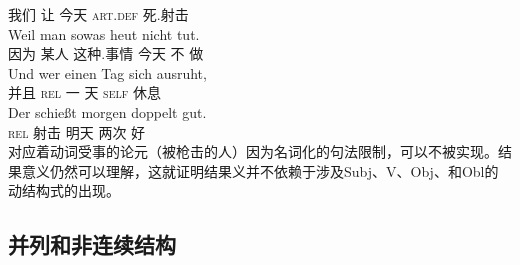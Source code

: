 \begin{exe}
\begin{xlist}[iv.]
\begin{exe}
\begin{xlist}[iv.]
我们  让    今天 \textsc{art}.\textsc{def} 死.射击\\
\gll  Weil  man sowas heut nicht tut.\\
      因为 某人 这种.事情 今天 不 做\\
\gll Und wer einen Tag sich ausruht,\\
     并且 \textsc{rel} 一 天 \textsc{self} 休息\\
\gll Der schießt morgen doppelt gut.\footnotemark\\
\textsc{rel} 射击 明天 两次 好\\
\zl
对应着动词受事的论元（被枪击的人）因为名词化的句法限制，可以不被实现。结果意义仍然可以理解，这就证明结果义并不依赖于涉及Subj、V、Obj、和Obl的动结构式的出现。

\subsection{并列和非连续结构}
\label{Abschnitt-Koordination}
\label{Abschnitt-Koordination-diskont}\label{sec-coordination-cg}


\end{xlist}
\end{exe}
\end{xlist}
\end{exe}

